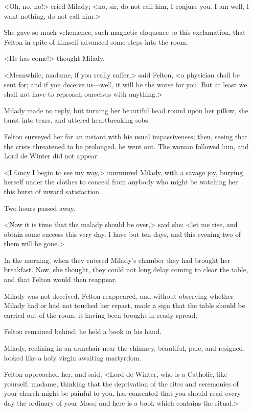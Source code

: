 <Oh, no, no!> cried Milady; <no, sir, do not call him, I conjure you. I am well, I want nothing; do not call him.> 

She gave so much vehemence, such magnetic eloquence to this exclamation, that Felton in spite of himself advanced some steps into the room. 

<He has come!> thought Milady. 

<Meanwhile, madame, if you really suffer,> said Felton, <a physician shall be sent for; and if you deceive us—well, it will be the worse for you. But at least we shall not have to reproach ourselves with anything.> 

Milady made no reply, but turning her beautiful head round upon her pillow, she burst into tears, and uttered heartbreaking sobs. 

Felton surveyed her for an instant with his usual impassiveness; then, seeing that the crisis threatened to be prolonged, he went out. The woman followed him, and Lord de Winter did not appear. 

<I fancy I begin to see my way,> murmured Milady, with a savage joy, burying herself under the clothes to conceal from anybody who might be watching her this burst of inward satisfaction. 

Two hours passed away. 

<Now it is time that the malady should be over,> said she; <let me rise, and obtain some success this very day. I have but ten days, and this evening two of them will be gone.> 

In the morning, when they entered Milady's chamber they had brought her breakfast. Now, she thought, they could not long delay coming to clear the table, and that Felton would then reappear. 

Milady was not deceived. Felton reappeared, and without observing whether Milady had or had not touched her repast, made a sign that the table should be carried out of the room, it having been brought in ready spread. 

Felton remained behind; he held a book in his hand. 

Milady, reclining in an armchair near the chimney, beautiful, pale, and resigned, looked like a holy virgin awaiting martyrdom. 

Felton approached her, and said, <Lord de Winter, who is a Catholic, like yourself, madame, thinking that the deprivation of the rites and ceremonies of your church might be painful to you, has consented that you should read every day the ordinary of your Mass; and here is a book which contains the ritual.> 

